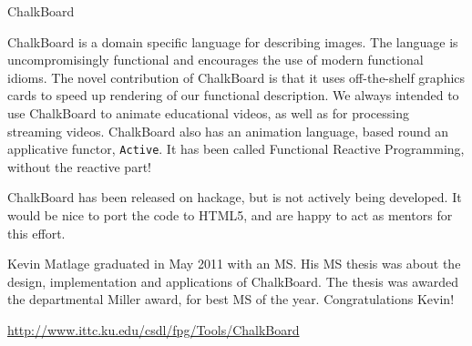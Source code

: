 \begin{hcarentry}{ChalkBoard}
\label{chalkboard}
\makeheader

ChalkBoard is a domain specific language for describing images. 
The language is uncompromisingly functional
and encourages the use of modern functional idioms.
The novel contribution of ChalkBoard is that it uses off-the-shelf
graphics cards to speed up rendering of our functional description.
We always intended to use ChalkBoard to animate educational
videos, as well as for processing streaming videos.
ChalkBoard also has an animation language,
based round an applicative functor, \verb|Active|.
It has been called Functional Reactive Programming,
without the reactive part! 

ChalkBoard has been released on hackage,
but is not actively being developed.
It would be nice to port the code to HTML5,
and are happy to act as mentors for this effort.

Kevin Matlage graduated in May 2011 with an MS. His MS thesis was about the
design, implementation and applications of ChalkBoard. The thesis was awarded
the departmental Miller award, for best MS of the year.
Congratulations Kevin!

\FurtherReading
  \url{http://www.ittc.ku.edu/csdl/fpg/Tools/ChalkBoard}
\end{hcarentry}
